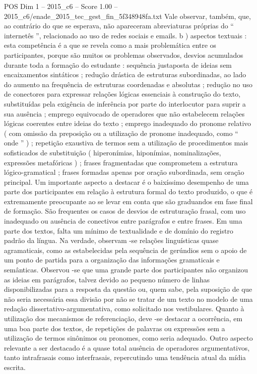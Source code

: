 \begin{textsample}{POS Dim 1 – 2015\_c6 – Score 1.00 – 2015\_c6/enade\_2015\_tec\_gest\_fin\_5f348948fa.txt}
Vale observar, também, que, ao contrário do que se esperava, não apareceram abreviaturas próprias do “ internetês ”, relacionado ao uso de redes sociais e emails. b ) aspectos textuais : esta competência é a que se revela como a mais problemática entre os participantes, porque são muitos os problemas observados, desvios acumulados durante toda a formação do estudante : sequência justaposta de ideias sem encaixamentos sintáticos ; redução drástica de estruturas subordinadas, ao lado do aumento na frequência de estruturas coordenadas e absolutas ; redução no uso de conectores para expressar relações lógicas essenciais à construção do texto, substituídas pela exigência de inferência por parte do interlocutor para suprir a sua ausência ; emprego equivocado de operadores que não estabelecem relações lógicas coerentes entre ideias do texto ; emprego inadequado do pronome relativo ( com omissão da preposição ou a utilização de pronome inadequado, como “ onde ” ) ; repetição exaustiva de termos sem a utilização de procedimentos mais sofisticados de substituição ( hiperonímias, hiponímias, nominalizações, expressões metafóricas ) ; frases fragmentadas que comprometem a estrutura lógico-gramatical ; frases formadas apenas por oração subordinada, sem oração principal.
Um importante aspecto a destacar é o baixíssimo desempenho de uma parte dos participantes em relação à estrutura formal do texto produzido, o que é extremamente preocupante ao se levar em conta que são graduandos em fase final de formação.
São frequentes os casos de desvios de estruturação frasal, com uso inadequado ou ausência de conectivos entre parágrafos e entre frases.
Em uma parte dos textos, falta um mínimo de textualidade e de domínio do registro padrão da língua.
Na verdade, observam -se relações linguísticas quase agramaticais, como as estabelecidas pela sequência de gerúndios sem o apoio de um ponto de partida para a organização das informações gramaticais e semânticas.
Observou -se que uma grande parte dos participantes não organizou as ideias em parágrafos, talvez devido ao pequeno número de linhas disponibilizadas para a resposta da questão ou, quem sabe, pela suposição de que não seria necessária essa divisão por não se tratar de um texto no modelo de uma redação dissertativo-argumentativa, como solicitado nos vestibulares.
Quanto à utilização dos mecanismos de referenciação, deve -se destacar a ocorrência, em uma boa parte dos textos, de repetições de palavras ou expressões sem a utilização de termos sinônimos ou pronomes, como seria adequado.
Outro aspecto relevante a ser destacado é a quase total ausência de operadores argumentativos, tanto intrafrasais como interfrasais, repercutindo uma tendência atual da mídia escrita.

\end{textsample}
